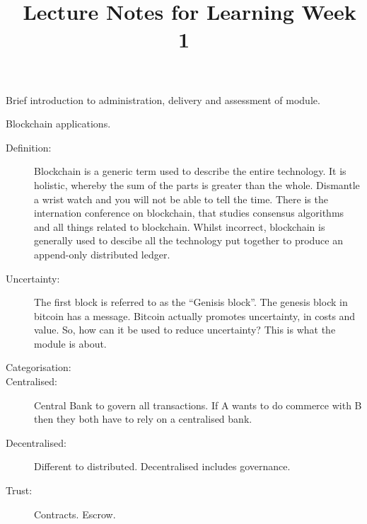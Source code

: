 \documentclass[]{article}
\newcommand{\theweek}{1}
\begin{document}
\title{\moduleCode\ Lecture Notes for Learning Week \theweek }
\author{\moduleLeader}
\maketitle

\printglossaries

Brief introduction to administration, delivery and assessment of module.

Blockchain applications.

\begin{description}
\item[Definition:] Blockchain is a generic term used to describe the entire technology. It is holistic, whereby the sum of the parts is greater than the whole. Dismantle a wrist watch and you will not be able to tell the time. There is the internation conference on blockchain, that studies consensus algorithms and all things related to blockchain. Whilst incorrect, blockchain is generally used to descibe all the technology put together to produce an append-only distributed ledger.
\item[Uncertainty:] The first block is referred to as the ``Genisis block''. The genesis block in bitcoin has a message. Bitcoin actually promotes uncertainty, in costs and value. So, how can it be used to reduce uncertainty? This is what the module is about.
\item[Categorisation:]
\item[Centralised:] Central Bank to govern all transactions. If A wants to do commerce with B then they both have to rely on a centralised bank. 
\item[Decentralised:] Different to distributed. Decentralised includes governance. 
\item[Trust:] Contracts. Escrow.  

\end{description}
\end{document}
